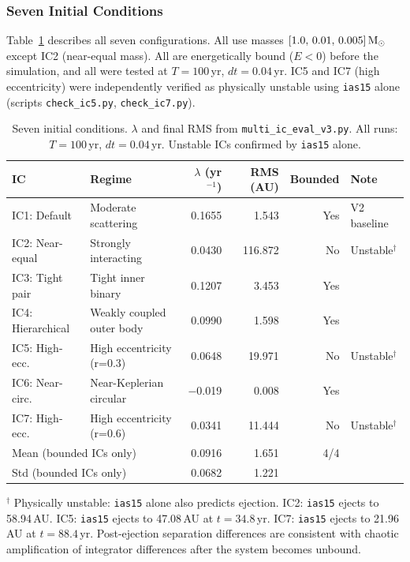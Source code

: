 \documentclass[12pt]{article}
\begin{document}
\subsubsection{Seven Initial Conditions}
\label{sec:7ics}

Table~\ref{tab:7ics} describes all seven configurations. All use masses
$[1.0,\,0.01,\,0.005]\,\rm M_\odot$ except IC2 (near-equal mass).
All are energetically bound ($E < 0$) before the simulation, and all were tested
at $T=100$\,yr, $dt=0.04$\,yr. IC5 and IC7 (high eccentricity) were independently
verified as physically unstable using \texttt{ias15} alone
(scripts \texttt{check\_ic5.py}, \texttt{check\_ic7.py}).

\begin{table}[H]
\centering
\caption{Seven initial conditions. $\lambda$ and final RMS from \texttt{multi\_ic\_eval\_v3.py}.
All runs: $T=100$\,yr, $dt=0.04$\,yr. Unstable ICs confirmed by \texttt{ias15} alone.}
\label{tab:7ics}
\small
\begin{tabular}{llrrrl}
\toprule
\textbf{IC} & \textbf{Regime} & \textbf{$\lambda$ (yr$^{-1}$)} & \textbf{RMS (AU)} & \textbf{Bounded} & \textbf{Note} \\
\midrule
IC1: Default     & Moderate scattering        & 0.1655  &   1.543  & Yes & V2 baseline \\
IC2: Near-equal  & Strongly interacting       & 0.0430  & 116.872  & No  & Unstable$^\dagger$ \\
IC3: Tight pair  & Tight inner binary         & 0.1207  &   3.453  & Yes & \\
IC4: Hierarchical& Weakly coupled outer body  & 0.0990  &   1.598  & Yes & \\
IC5: High-ecc.   & High eccentricity (r=0.3)  & 0.0648  &  19.971  & No  & Unstable$^\dagger$ \\
IC6: Near-circ.  & Near-Keplerian circular    & $-$0.019 &  0.008  & Yes & \\
IC7: High-ecc.   & High eccentricity (r=0.6)  & 0.0341  &  11.444  & No  & Unstable$^\dagger$ \\
\midrule
\multicolumn{2}{l}{Mean (bounded ICs only)} & 0.0916 & 1.651 & 4/4 & \\
\multicolumn{2}{l}{Std  (bounded ICs only)} & 0.0682 & 1.221 & & \\
\bottomrule
\end{tabular}
\vspace{2pt}

\footnotesize{$^\dagger$ Physically unstable: \texttt{ias15} alone also predicts ejection.
IC2: \texttt{ias15} ejects to 58.94\,AU. IC5: \texttt{ias15} ejects to 47.08\,AU at $t=34.8$\,yr.
IC7: \texttt{ias15} ejects to 21.96\,AU at $t=88.4$\,yr. Post-ejection separation differences
are consistent with chaotic amplification of integrator differences after the system becomes unbound.}
\end{table}
\end{document}
